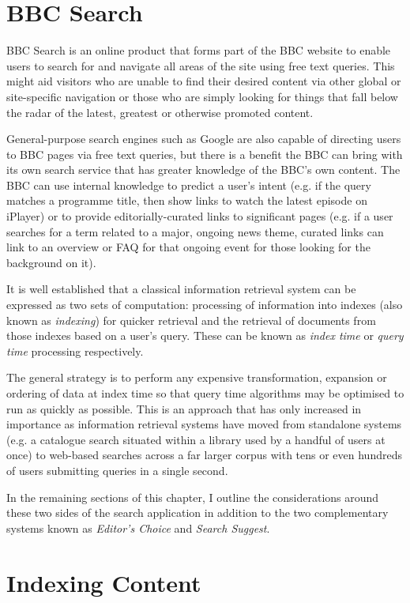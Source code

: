 \documentclass[10pt,a4paper]{report}
\begin{document}
\section{BBC Search}

BBC Search is an online product that forms part of the BBC website
to enable users to search for and navigate all areas of the site using
free text queries. This might aid visitors who are unable to find their desired
content via other global or site-specific navigation or those who are simply
looking for things that fall below the radar of the latest, greatest or
otherwise promoted content.

General-purpose search engines such as Google are also capable of directing
users to BBC pages via free text queries, but there is a benefit the BBC
can bring with its own search service that has greater knowledge of the
BBC's own content. The BBC can use internal knowledge to predict a user's
intent (e.g. if the query matches a programme title, then show links to watch
the latest episode on iPlayer) or to provide editorially-curated
links to significant pages (e.g. if a user searches for a term
related to a major, ongoing news theme, curated links can
link to an overview or FAQ for that ongoing event for those
looking for the background on it).

It is well established that a classical information retrieval system
can be expressed as two sets of computation: processing of information
into indexes (also known as \emph{indexing}) for quicker retrieval
and the retrieval of documents from those indexes based on a user's
query. These can be known as \emph{index time} or \emph{query time}
processing respectively.

The general strategy is to perform
any expensive transformation, expansion or ordering of data
at index time so that query time algorithms may be optimised to
run as quickly as possible. This is an approach that has only
increased in importance as information retrieval systems have moved
from standalone systems (e.g. a catalogue search situated within
a library used by a handful of users at once) to web-based
searches across a far larger corpus with tens or even hundreds of
users submitting queries in a single second.

In the remaining sections of this chapter, I outline the considerations
around these two sides of the search application in addition to the
two complementary systems known as \emph{Editor's Choice} and
\emph{Search Suggest}.

\section{Indexing Content}
\end{document}
